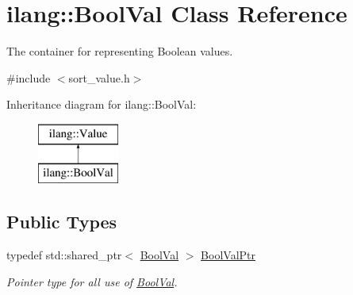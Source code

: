 \hypertarget{classilang_1_1_bool_val}{}\section{ilang\+:\+:Bool\+Val Class Reference}
\label{classilang_1_1_bool_val}


The container for representing Boolean values.  




{\ttfamily \#include $<$sort\+\_\+value.\+h$>$}

Inheritance diagram for ilang\+:\+:Bool\+Val\+:\begin{figure}[H]
\begin{center}
\leavevmode
\includegraphics[height=2.000000cm]{classilang_1_1_bool_val}
\end{center}
\end{figure}
\subsection*{Public Types}
\begin{DoxyCompactItemize}
\item 
\mbox{\label{classilang_1_1_bool_val_aba4dff009d7d7f6c0a879312dbb23ba3}} 
typedef std\+::shared\+\_\+ptr$<$ \mbox{\hyperlink{classilang_1_1_bool_val}{Bool\+Val}} $>$ \mbox{\hyperlink{classilang_1_1_bool_val_aba4dff009d7d7f6c0a879312dbb23ba3}{Bool\+Val\+Ptr}}
\begin{DoxyCompactList}\small\item\em Pointer type for all use of \mbox{\hyperlink{classilang_1_1_bool_val}{Bool\+Val}}. \end{DoxyCompactList}\end{DoxyCompactItemize}
